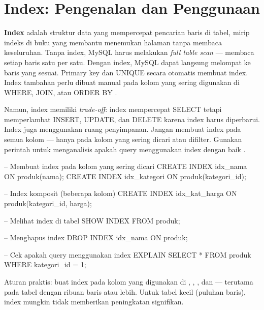 \section{Index: Pengenalan dan Penggunaan}

\textbf{Index} adalah struktur data yang mempercepat pencarian baris di tabel, mirip indeks di buku yang membantu menemukan halaman tanpa membaca keseluruhan. Tanpa index, MySQL harus melakukan \textit{full table scan} --- membaca setiap baris satu per satu. Dengan index, MySQL dapat langsung melompat ke baris yang sesuai. Primary key dan UNIQUE secara otomatis membuat index. Index tambahan perlu dibuat manual pada kolom yang sering digunakan di WHERE, JOIN, atau ORDER BY \cite{mysqlDocs}.

Namun, index memiliki \textit{trade-off}: index mempercepat SELECT tetapi memperlambat INSERT, UPDATE, dan DELETE karena index harus diperbarui. Index juga menggunakan ruang penyimpanan. Jangan membuat index pada semua kolom --- hanya pada kolom yang sering dicari atau difilter. Gunakan perintah  untuk menganalisis apakah query menggunakan index dengan baik \cite{mysqlGettingStarted}.

\begin{webcode}[language=SQL, caption={Membuat dan mengelola index}]
-- Membuat index pada kolom yang sering dicari
CREATE INDEX idx_nama ON produk(nama);
CREATE INDEX idx_kategori ON produk(kategori_id);

-- Index komposit (beberapa kolom)
CREATE INDEX idx_kat_harga ON produk(kategori_id, harga);

-- Melihat index di tabel
SHOW INDEX FROM produk;

-- Menghapus index
DROP INDEX idx_nama ON produk;

-- Cek apakah query menggunakan index
EXPLAIN SELECT * FROM produk WHERE kategori_id = 1;
\end{webcode}

\begin{catatan}
Aturan praktis: buat index pada kolom yang digunakan di , , , dan  --- terutama pada tabel dengan ribuan baris atau lebih. Untuk tabel kecil (puluhan baris), index mungkin tidak memberikan peningkatan signifikan.
\end{catatan}

